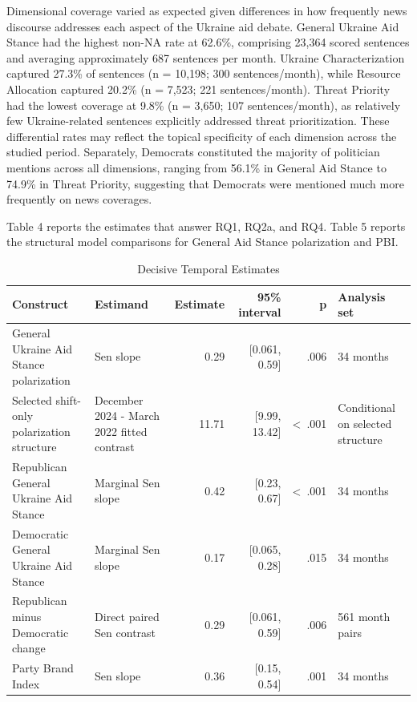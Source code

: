 Dimensional coverage varied as expected given differences in how frequently news discourse addresses each aspect of the Ukraine aid debate. General Ukraine Aid Stance had the highest non-NA rate at 62.6\%, comprising 23,364 scored sentences and averaging approximately 687 sentences per month. Ukraine Characterization captured 27.3\% of sentences (n = 10,198; 300 sentences/month), while Resource Allocation captured 20.2\% (n = 7,523; 221 sentences/month). Threat Priority had the lowest coverage at 9.8\% (n = 3,650; 107 sentences/month), as relatively few Ukraine-related sentences explicitly addressed threat prioritization. These differential rates may reflect the topical specificity of each dimension across the studied period. Separately, Democrats constituted the majority of politician mentions across all dimensions, ranging from 56.1\% in General Aid Stance to 74.9\% in Threat Priority, suggesting that Democrats were mentioned much more frequently on news coverages.

Table 4 reports the estimates that answer RQ1, RQ2a, and RQ4. Table 5 reports the structural model comparisons for General Aid Stance polarization and PBI.


\begin{table}[htbp]
\centering
\small
\begin{threeparttable}
\caption{Decisive Temporal Estimates}
\label{tab:4}
\begin{tabularx}{\textwidth}{@{}L{1.30}L{0.95}rrrL{0.85}@{}}
\toprule
\textbf{Construct} & \textbf{Estimand} & \textbf{Estimate} & \textbf{95\% interval} & \textbf{p} & \textbf{Analysis set} \\
\midrule
General Ukraine Aid Stance polarization & Sen slope & 0.29 & [0.061, 0.59] & .006 & 34 months \\
Selected shift-only polarization structure & December 2024 - March 2022 fitted contrast & 11.71 & [9.99, 13.42] & <~.001 & Conditional on selected structure \\
Republican General Ukraine Aid Stance & Marginal Sen slope & 0.42 & [0.23, 0.67] & <~.001 & 34 months \\
Democratic General Ukraine Aid Stance & Marginal Sen slope & 0.17 & [0.065, 0.28] & .015 & 34 months \\
Republican minus Democratic change & Direct paired Sen contrast & 0.29 & [0.061, 0.59] & .006 & 561 month pairs \\
Party Brand Index & Sen slope & 0.36 & [0.15, 0.54] & .001 & 34 months \\
\bottomrule
\end{tabularx}
\end{threeparttable}
\end{table}



